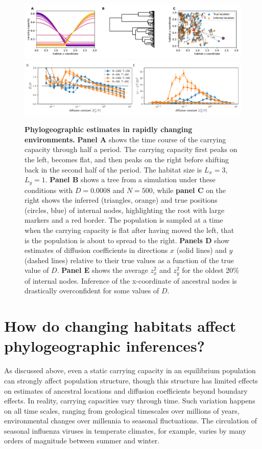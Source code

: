 \documentclass[aps,rmp, twocolumn]{revtex4}
\begin{document}
\begin{figure}
    \includegraphics[width=\textwidth]{figures/seasaw_example}
    \includegraphics[width=\textwidth]{figures/seasaw}
    \caption{\label{fig:seasaw} {\bf Phylogeographic estimates in rapidly changing environments.} {\bf Panel A} shows the time course of the carrying capacity through half a period. The carrying capacity first peaks on the left, becomes flat, and then peaks on the right before shifting back in the second half of the period. The habitat size is $L_x=3$, $L_y=1$.
    {\bf Panel B} shows a tree from a simulation under these conditions with $D=0.0008$ and $N=500$, while {\bf panel C} on the right shows the inferred (triangles, orange) and true positions (circles, blue) of internal nodes, highlighting the root with large markers and a red border.
    The population is sampled at a time when the carrying capacity is flat after having moved the left, that is the population is about to spread to the right.
    {\bf Panels D} show estimates of diffusion coefficients in directions $x$ (solid lines) and $y$ (dashed lines) relative to their true values as a function of the true value of $D$. {\bf Panel E} shows the average $z_x^2$ and $z_y^2$ for the oldest 20\% of internal nodes. Inference of the x-coordinate of ancestral nodes is drastically overconfident for some values of $D$. }
\end{figure}

\section*{How do changing habitats affect phylogeographic inferences?}
As discussed above, even a static carrying capacity in an equilibrium population can strongly affect population structure, though this structure has limited effects on estimates of ancestral locations and diffusion coefficients beyond boundary effects.
In reality, carrying capacities vary through time.
Such variation happens on all time scales, ranging from geological timescales over millions of years, environmental changes over millennia to seasonal fluctuations.
The circulation of seasonal influenza viruses in temperate climates, for example, varies by many orders of magnitude between summer and winter.
\end{document}
